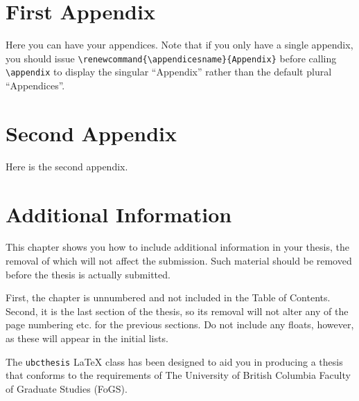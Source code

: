 \documentclass[msc,oneside]{ubcthesis}
\begin{document}




\appendix
\chapter{First Appendix}
Here you can have your appendices.  Note that if you only have a
single appendix, you should issue
\verb|\renewcommand{\appendicesname}{Appendix}| before calling
\verb|\appendix| to display the singular ``Appendix'' rather than the
default plural ``Appendices''.

\chapter{Second Appendix}
Here is the second appendix.

\backmatter


\chapter*{Additional Information}
This chapter shows you how to include additional information in your
thesis, the removal of which will not affect the submission.  Such
material should be removed before the thesis is actually submitted.

First, the chapter is unnumbered and not included in the Table of
Contents.  Second, it is the last section of the thesis, so its
removal will not alter any of the page numbering etc. for the previous
sections.  Do not include any floats, however, as these will appear in
the initial lists.

The \texttt{ubcthesis} \LaTeX{} class has been designed to aid you in
producing a thesis that conforms to the requirements of The
University of British Columbia Faculty of Graduate Studies (FoGS).
\end{document}
